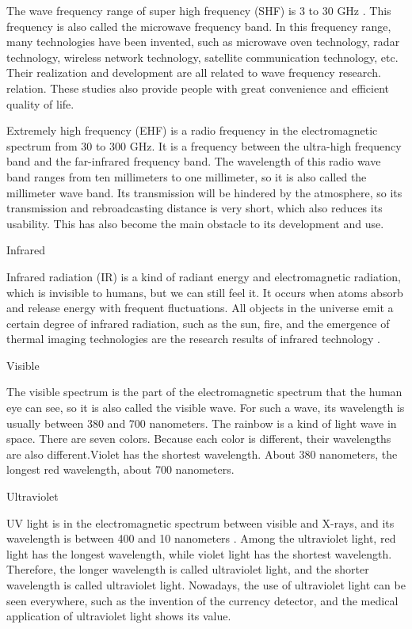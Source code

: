 \documentclass[conference]{IEEEtran}
\newcommand{\subparagraph}{}
\begin{document}
The wave frequency range of super high frequency (SHF) is 3 to 30 GHz \cite{Superhig8:online}. This frequency is also called the microwave frequency band. In this frequency range, many technologies have been invented, such as microwave oven technology, radar technology, wireless network technology, satellite communication technology, etc. Their realization and development are all related to wave frequency research. relation. These studies also provide people with great convenience and efficient quality of life.
    
Extremely high frequency (EHF) is a radio frequency in the electromagnetic spectrum from 30 to 300 GHz. It is a frequency between the ultra-high frequency band and the far-infrared frequency band. The wavelength of this radio wave band ranges from ten millimeters to one millimeter, so it is also called the millimeter wave band\cite{Extremel31:online}. Its transmission will be hindered by the atmosphere, so its transmission and rebroadcasting distance is very short, which also reduces its usability. This has also become the main obstacle to its development and use.

\subparagraph{Infrared}
    
Infrared radiation (IR) is a kind of radiant energy and electromagnetic radiation, which is invisible to humans, but we can 
still feel it. It occurs when atoms absorb and release energy with frequent fluctuations. All objects in the universe emit a 
certain degree of infrared radiation, such as the sun, fire, and the emergence of thermal imaging technologies are the research 
results of infrared technology \cite{L40416:online}.

\subparagraph{Visible}
    
The visible spectrum is the part of the electromagnetic spectrum that the human eye can see, so it is also called the visible wave. For such a wave, its wavelength is usually between 380 and 700 nanometers. The rainbow is a kind of light wave in space. There are seven colors. Because each color is different, their wavelengths are also different.Violet has the shortest wavelength. About 380 nanometers, the longest red wavelength, about 700 nanometers\cite{Vis73:online}.
 
\subparagraph{Ultraviolet}
    
UV light is in the electromagnetic spectrum between visible and X-rays, and its wavelength is between 400 and 10 nanometers \cite{uvlight14:online}. Among the ultraviolet light, red light has the longest wavelength, while violet light has the shortest wavelength. Therefore, the longer wavelength is called ultraviolet light, and the shorter wavelength is called ultraviolet light. Nowadays, the use of ultraviolet light can be seen everywhere, such as the invention of the currency detector, and the medical application of ultraviolet light shows its value.
\end{document}
